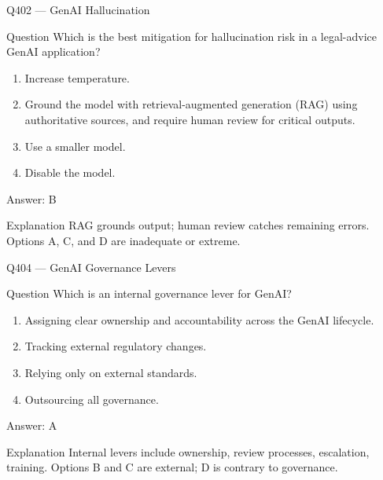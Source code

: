\documentclass[aspectratio=169,8pt]{beamer}
\begin{document}
	
	\begin{frame}{Q402 --- GenAI Hallucination}
		\begin{block}{Question}
			Which is the best mitigation for hallucination risk in a legal-advice GenAI application?
			\begin{enumerate}
				\item Increase temperature.
				\item Ground the model with retrieval-augmented generation (RAG) using authoritative sources, and require human review for critical outputs.
				\item Use a smaller model.
				\item Disable the model.
			\end{enumerate}
		\end{block}
		\begin{exampleblock}{Answer: B}\end{exampleblock}
		\begin{block}{Explanation}
			RAG grounds output; human review catches remaining errors. Options A, C, and D are inadequate or extreme.
		\end{block}
	\end{frame}
	
	
	\begin{frame}{Q404 --- GenAI Governance Levers}
		\begin{block}{Question}
			Which is an internal governance lever for GenAI?
			\begin{enumerate}
				\item Assigning clear ownership and accountability across the GenAI lifecycle.
				\item Tracking external regulatory changes.
				\item Relying only on external standards.
				\item Outsourcing all governance.
			\end{enumerate}
		\end{block}
		\begin{exampleblock}{Answer: A}\end{exampleblock}
		\begin{block}{Explanation}
			Internal levers include ownership, review processes, escalation, training. Options B and C are external; D is contrary to governance.
		\end{block}
	\end{frame}
	
\end{document}
